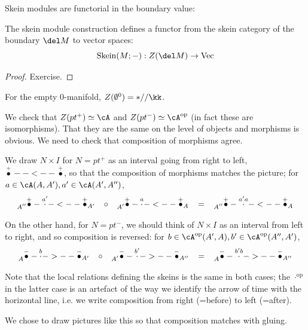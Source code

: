\documentclass[12pt]{article}
\newcommand{\empt}[1]{{\emptyset^{#1}}}
\DeclareMathOperator{\Skein}{Skein}
\newcommand{\op}{{\text{op}}}
\DeclareMathOperator{\Vect}{Vec}
\begin{document}
Skein modules are functorial in the boundary value:

\begin{proposition}
\label{p:skein-functorial}
The skein module construction defines a functor from
the skein category of the boundary $\del M$ to vector spaces:
\[
\Skein(M;-) : Z(\del M) \to \Vect
\]
\end{proposition}
\begin{proof}
Exercise.
\end{proof}

\begin{example}
For the empty 0-manifold, $Z(\empt{0}) = *//\kk$.
\end{example}

\begin{example}
\label{x:point}
We check that
$Z(pt^+) \simeq \cA$ and $Z(pt^-) \simeq \cA^\op$
(in fact these are isomorphisms).
That they are the same on the level of objects
and morphisms is obvious.
We need to check that composition of morphisms agree.

We draw $N \times I$ for $N = pt^+$
as an interval going from right to left,
$\overset{+}{\bullet}--<--\overset{+}{\bullet}$,
so that the composition of morphisms matches the picture;
for $a \in \cA(A,A'), a' \in \cA(A',A'')$,
\[
\prescript{}{A''}{\overset{+}{\bullet}}-\overset{a'}{\cdot}-<--
\overset{+}{\bullet}_{A'}
\;\;\;
\circ
\;\;\;
\prescript{}{A'}{\overset{+}{\bullet}}-\overset{a}{\cdot}-<--
\overset{+}{\bullet}_{A}
\;\;\;
=
\;\;\;
\prescript{}{A''}{\overset{+}{\bullet}}-\overset{a'a}{\cdot}-<--
\overset{+}{\bullet}_{A}
\]

On the other hand, for $N = pt^-$,
we should think of $N \times I$ as an interval from left to right,
and so composition is reversed:
for $b \in \cA^\op(A',A), b' \in \cA^\op(A'',A')$,
\[
\prescript{}{A}{\overset{-}{\bullet}}-\overset{b}{\cdot}->--
\overset{-}{\bullet}_{A'}
\;\;\;
\circ
\;\;\;
\prescript{}{A'}{\overset{-}{\bullet}}-\overset{b'}{\cdot}->--
\overset{-}{\bullet}_{A''}
\;\;\;
=
\;\;\;
\prescript{}{A}{\overset{-}{\bullet}}-\overset{b'b}{\cdot}->--
\overset{-}{\bullet}_{A''}
\]
\end{example}


\begin{remark}
\label{r:arrow-of-time}
Note that the local relations defining the skeins is the same
in both cases; the $\cdot^\op$ in the latter case is an artefact of the
way we identify the arrow of time with the horizontal line,
i.e. we write composition from right (=before) to left (=after).

We chose to draw pictures like this
so that composition matches with gluing.
\end{remark}
\end{document}
